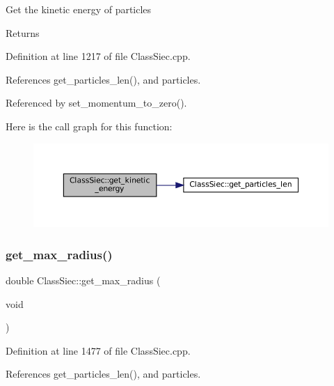 Get the kinetic energy of particles \begin{DoxyReturn}{Returns}

\end{DoxyReturn}


Definition at line 1217 of file Class\+Siec.\+cpp.



References get\+\_\+particles\+\_\+len(), and particles.



Referenced by set\+\_\+momentum\+\_\+to\+\_\+zero().

Here is the call graph for this function\+:\nopagebreak
\begin{figure}[H]
\begin{center}
\leavevmode
\includegraphics[width=350pt]{classClassSiec_ae5515f653846b695b3ab00682d15c6fc_cgraph}
\end{center}
\end{figure}
\mbox{\label{classClassSiec_a078c088fe48696423cc5c6c429d45eab}} 
\subsubsection{\texorpdfstring{get\+\_\+max\+\_\+radius()}{get\_max\_radius()}}
{\footnotesize\ttfamily double Class\+Siec\+::get\+\_\+max\+\_\+radius (\begin{DoxyParamCaption}\item[{void}]{ }\end{DoxyParamCaption})}



Definition at line 1477 of file Class\+Siec.\+cpp.



References get\+\_\+particles\+\_\+len(), and particles.

